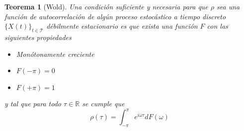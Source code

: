 \documentclass[12pt,letterpaper,draft]{book}
\newtheorem{teorema}{Teorema}[chapter]
\newcommand{\R}{\mathbb{R}}
\newcommand{\intPI}{\int_{-\pi}^{\pi}}
\newcommand{\xt}{$\{X(t)\}_{t\in \mathcal{T}}$ }
\begin{document}
\begin{teorema}[Wold]
Una condición suficiente y necesaria para que $\rho$ sea una función de autocorrelación de 
algún proceso estocástico a tiempo discreto \xt débilmente estacionario es que exista 
una función $F$ con las siguientes propiedades
\begin{itemize}
\item Monótonamente creciente
\item $F(-\pi) = 0$
\item $F(+\pi) = 1$
\end{itemize}
y tal que para todo $\tau \in \R$ se cumple que
\begin{equation*}
\rho(\tau) = \intPI e^{i \omega \tau} dF(\omega)
\end{equation*}
\label{t_wold}
\end{teorema}
\end{document}

